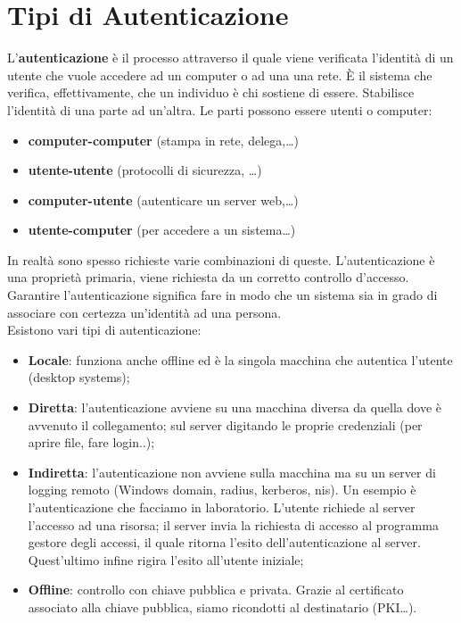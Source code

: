 \section{Tipi di Autenticazione}

L'\textbf{autenticazione} è il processo attraverso il quale viene verificata
l'identità di un utente che vuole
accedere ad un computer o ad una una rete. È il sistema che verifica,
effettivamente, che un
individuo è chi sostiene di essere. Stabilisce l'identità di una parte ad un'altra.
Le parti possono essere utenti o computer:

\begin{itemize}
      \item \textbf{computer-computer} (stampa in rete, delega,…)
      \item \textbf{utente-utente} (protocolli di sicurezza, …)
      \item \textbf{computer-utente} (autenticare un server web,…)
      \item \textbf{utente-computer} (per accedere a un sistema…)
\end{itemize}

In realtà sono spesso richieste varie combinazioni di queste.
L'autenticazione è una proprietà primaria, viene richiesta da un corretto
controllo d'accesso.
Garantire l'autenticazione significa fare in modo che un sistema sia in grado di
associare con
certezza un'identità ad una persona.\\

Esistono vari tipi di autenticazione:

\begin{itemize}
      \item \textbf{Locale}: funziona anche offline ed è la singola macchina
            che autentica l'utente (desktop systems);
      \item \textbf{Diretta}: l'autenticazione avviene su una macchina diversa
            da quella dove è avvenuto il
            collegamento; sul server digitando le proprie credenziali
            (per aprire file, fare login..);
      \item \textbf{Indiretta}: l'autenticazione non avviene sulla macchina ma su un server
            di logging remoto (Windows
            domain, radius, kerberos, nis). Un esempio è l'autenticazione che
            facciamo in laboratorio. L'utente richiede al server l'accesso ad una
            risorsa; il server invia la richiesta di accesso al
            programma gestore degli accessi, il quale ritorna l'esito
            dell'autenticazione al server. Quest'ultimo
            infine rigira l'esito all'utente iniziale;
      \item \textbf{Offline}: controllo con chiave pubblica e privata.
            Grazie al certificato associato alla chiave
            pubblica, siamo ricondotti al destinatario (PKI…).
\end{itemize}

